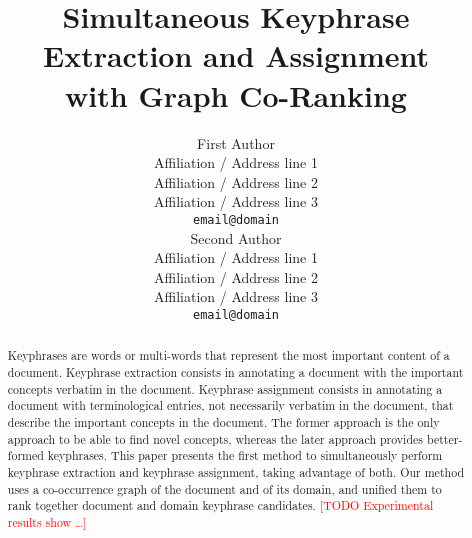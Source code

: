 \documentclass[11pt]{article}
\title{Simultaneous Keyphrase Extraction and Assignment\\with Graph Co-Ranking}
\author{First Author \\
  Affiliation / Address line 1 \\
  Affiliation / Address line 2 \\
  Affiliation / Address line 3 \\
  {\tt email@domain} \\\And
  Second Author \\
  Affiliation / Address line 1 \\
  Affiliation / Address line 2 \\
  Affiliation / Address line 3 \\
  {\tt email@domain} \\}
\date{}
\newcommand\TODO[1]{\textcolor{red}{[TODO #1]}}
\begin{document}
  \maketitle

  \begin{abstract}
    Keyphrases are words or multi-words that represent the most important
    content of a document.
    Keyphrase extraction consists in annotating a document with the important
    concepts verbatim in the document. Keyphrase assignment consists in
    annotating a document with terminological entries, not necessarily verbatim
    in the document, that describe the important concepts in the document. The
    former approach is the only approach to be able to find novel concepts,
    whereas the later approach provides better-formed keyphrases. This paper
    presents the first method to simultaneously perform keyphrase extraction and
    keyphrase assignment, taking advantage of both. Our method uses a
    co-occurrence graph of the document and of its domain, and unified them to
    rank together document and domain keyphrase candidates. \TODO{Experimental
    results show \dots}
  \end{abstract}

  
  
  
  
  
  


  
  
\end{document}
